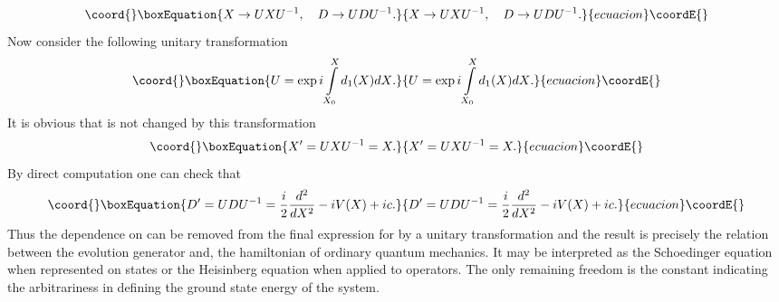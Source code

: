 \documentclass[a4paper,11pt]{article}
\begin{document}
\begin{equation}\coord{}\boxEquation{
X\rightarrow UXU^{-1}, \ \ \ D \rightarrow UDU^{-1}. \label{untr0}
}{
X\rightarrow UXU^{-1}, \ \ \ D \rightarrow UDU^{-1}. }{ecuacion}\coordE{}\end{equation}
Now consider the following unitary transformation
\begin{equation}\coord{}\boxEquation{
U=\exp{i \int\limits_{X_0}^{X} d_1(X)dX}. \label{untr}
}{
U=\exp{i \int\limits_{X_0}^{X} d_1(X)dX}. }{ecuacion}\coordE{}\end{equation}
It is obvious that \coordHE{} is not changed by this transformation
\begin{equation}\coord{}\boxEquation{
X'=UXU^{-1}=X.
}{
X'=UXU^{-1}=X.
}{ecuacion}\coordE{}\end{equation}
By direct computation one can check that
\begin{equation}\coord{}\boxEquation{
D'=UDU^{-1}=\frac{i}{2}\frac{d^2}{dX^2}- i V(X)+ic. \label{sgeq1}
}{
D'=UDU^{-1}=\frac{i}{2}\frac{d^2}{dX^2}- i V(X)+ic. }{ecuacion}\coordE{}\end{equation}
Thus the dependence on \coordHE{} can be removed from the final
expression for \coordHE{} by a unitary transformation and the result is
precisely the relation between the evolution generator and, the
hamiltonian of ordinary quantum mechanics. It may be interpreted
as the Schoedinger equation when represented on states or the
Heisinberg equation when applied to operators. The only remaining
freedom is the constant \coordHE{} indicating the arbitrariness in
defining the ground state energy of the system.
\end{document}
